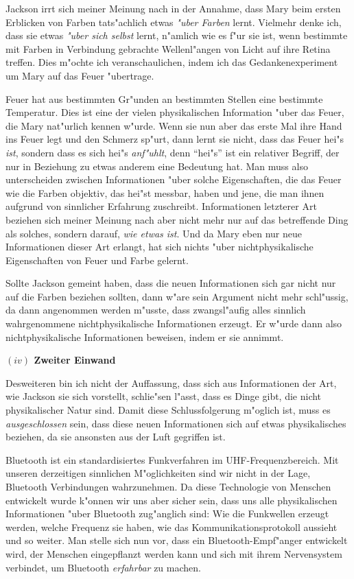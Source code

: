 \documentclass[a4paper, emulatestandardclasses, 12pt]{scrartcl}
\begin{document}
\begin{onehalfspace}
\noindent Jackson irrt sich meiner Meinung nach in der Annahme, dass Mary beim ersten Erblicken von Farben tats"achlich etwas \emph{"uber Farben} lernt. Vielmehr denke ich, dass sie etwas \emph{"uber sich selbst} lernt, n"amlich wie es f"ur sie ist, wenn bestimmte mit Farben in Verbindung gebrachte Wellenl"angen von Licht auf ihre Retina treffen. Dies m"ochte ich veranschaulichen, indem ich das Gedankenexperiment um Mary auf das Feuer "ubertrage. 

Feuer hat aus bestimmten Gr"unden an bestimmten Stellen eine bestimmte Temperatur. Dies ist eine der vielen physikalischen Information "uber das Feuer, die Mary nat"urlich kennen w"urde. Wenn sie nun aber das erste Mal ihre Hand ins Feuer legt und den Schmerz sp"urt, dann lernt sie nicht, dass das Feuer hei"s \emph{ist}, sondern dass es sich hei"s \emph{anf"uhlt}, denn "`hei"s"' ist ein relativer Begriff, der nur in Beziehung zu etwas anderem eine Bedeutung hat. Man muss also unterscheiden zwischen Informationen "uber solche Eigenschaften, die das Feuer wie die Farben objektiv, das hei"st messbar, haben und jene, die man ihnen aufgrund von sinnlicher Erfahrung zuschreibt. Informationen letzterer Art beziehen sich meiner Meinung nach aber nicht mehr nur auf das betreffende Ding als solches, sondern darauf, \emph{wie etwas ist}. Und da Mary eben nur neue Informationen dieser Art erlangt, hat sich nichts "uber nichtphysikalische Eigenschaften von Feuer und Farbe gelernt. 

Sollte Jackson gemeint haben, dass die neuen Informationen sich gar nicht nur auf die Farben beziehen sollten, dann w"are sein Argument nicht mehr schl"ussig, da dann angenommen werden m"usste, dass zwangsl"aufig alles sinnlich wahrgenommene nichtphysikalische Informationen erzeugt. Er w"urde dann also nichtphysikalische Informationen beweisen, indem er sie annimmt.

\vspace{5mm}
\noindent\textbf{$(iv)$ Zweiter Einwand}

\noindent Desweiteren bin ich nicht der Auffassung, dass sich aus Informationen der Art, wie Jackson sie sich vorstellt, schlie"sen l"asst, dass es Dinge gibt, die nicht physikalischer Natur sind. %
Damit diese Schlussfolgerung m"oglich ist, muss es \emph{ausgeschlossen} sein, dass diese neuen Informationen sich auf etwas physikalisches beziehen, da sie ansonsten aus der Luft gegriffen ist. 

Bluetooth ist ein standardisiertes Funkverfahren im UHF-Frequenzbereich. Mit unseren derzeitigen sinnlichen M"oglichkeiten sind wir nicht in der Lage, Bluetooth Verbindungen wahrzunehmen. Da diese Technologie von Menschen entwickelt wurde k"onnen wir uns aber sicher sein, dass uns alle physikalischen Informationen "uber Bluetooth zug"anglich sind: Wie die Funkwellen erzeugt werden, welche Frequenz sie haben, wie das Kommunikationsprotokoll aussieht und so weiter. Man stelle sich nun vor, dass ein Bluetooth-Empf"anger entwickelt wird, der Menschen eingepflanzt werden kann und sich mit ihrem Nervensystem verbindet, um Bluetooth \emph{erfahrbar} zu machen. 


\end{onehalfspace}
\end{document}
